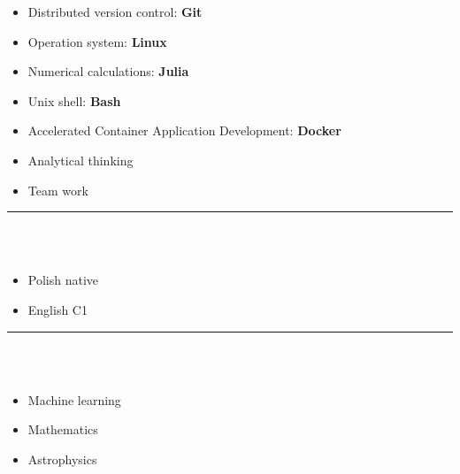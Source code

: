 \documentclass[10pt]{article}
\begin{document}
\begin{minipage}[t]{0.30\textwidth}
\begin{itemize}[leftmargin=*]
            \item Distributed version control: \textbf{Git}
            \item Operation system: \textbf{Linux}
            \item Numerical calculations: \textbf{Julia}
            \item Unix shell: \textbf{Bash} 
            \item Accelerated Container Application Development: \textbf{Docker}
            \item Analytical thinking
            \item Team work
        \end{itemize}
        \rule{6cm}{1pt} \\ \\
        \fontsize{10pt}{10pt}
        \begin{itemize}[leftmargin=*]
            \setlength{\parskip}{0pt}
            \item Polish native
            \item English C1
        \end{itemize}
        \rule{6cm}{1pt} \\ \\
        \fontsize{10pt}{10pt}
        \begin{itemize}[leftmargin=*]
            \setlength{\parskip}{0pt}
            \item Machine learning
            \item Mathematics 
            \item Astrophysics
        \end{itemize}
    \end{minipage}
    \hfill %
\end{document}
